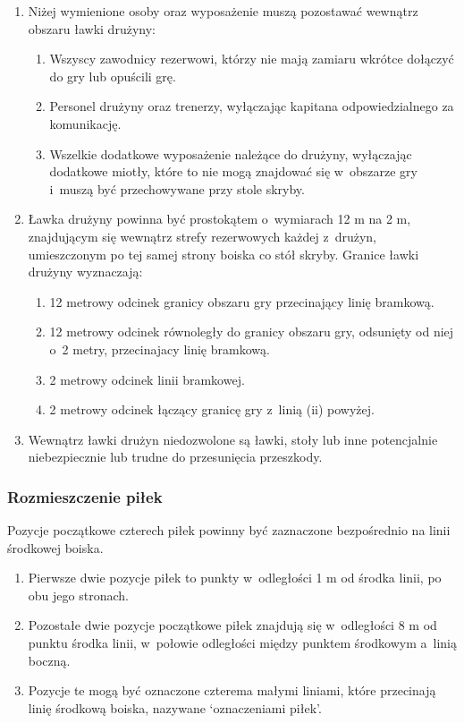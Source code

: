 \documentclass[12pt]{article}
\begin{document}
\begin{enumerate}
	\item Niżej wymienione osoby oraz wyposażenie muszą pozostawać wewnątrz
	      obszaru ławki drużyny:

	      \begin{enumerate}
		      \item Wszyscy zawodnicy rezerwowi, którzy nie mają zamiaru wkrótce
		            dołączyć do gry lub opuścili grę.
		      \item Personel drużyny oraz trenerzy, wyłączając kapitana odpowiedzialnego
		            za komunikację.
		      \item Wszelkie dodatkowe wyposażenie należące do drużyny, wyłączając
		            dodatkowe miotły, które to nie mogą znajdować się w~obszarze gry i~muszą być przechowywane przy stole skryby.
	      \end{enumerate}

	\item Ławka drużyny powinna być prostokątem o~wymiarach 12 m na 2 m,
	      znajdującym się wewnątrz strefy rezerwowych każdej z~drużyn,
	      umieszczonym po tej samej strony boiska co stół skryby. Granice ławki
	      drużyny wyznaczają:

	      \begin{enumerate}
		      \item 12 metrowy odcinek granicy obszaru gry przecinający linię bramkową.
		      \item 12 metrowy odcinek równoległy do granicy obszaru gry, odsunięty od
		            niej o~2 metry, przecinajacy linię bramkową.
		      \item 2 metrowy odcinek linii bramkowej.
		      \item 2 metrowy odcinek łączący granicę gry z~linią (ii) powyżej.
	      \end{enumerate}

	\item Wewnątrz ławki drużyn niedozwolone są ławki, stoły lub inne
	      potencjalnie niebezpiecznie lub trudne do przesunięcia przeszkody.
\end{enumerate}

\subsubsection{Rozmieszczenie piłek}

Pozycje początkowe czterech piłek powinny być zaznaczone bezpośrednio na
linii środkowej boiska.
\begin{enumerate}
	\item Pierwsze dwie pozycje piłek to punkty w~odległości 1 m od środka
	      linii, po obu jego stronach.

	\item Pozostałe dwie pozycje początkowe piłek znajdują się w~odległości 8 m
	      od punktu środka linii, w~połowie odległości między punktem środkowym a~linią boczną.

	\item Pozycje te mogą być oznaczone czterema małymi liniami, które
	      przecinają linię środkową boiska, nazywane `oznaczeniami piłek'.
\end{enumerate}
\end{document}

